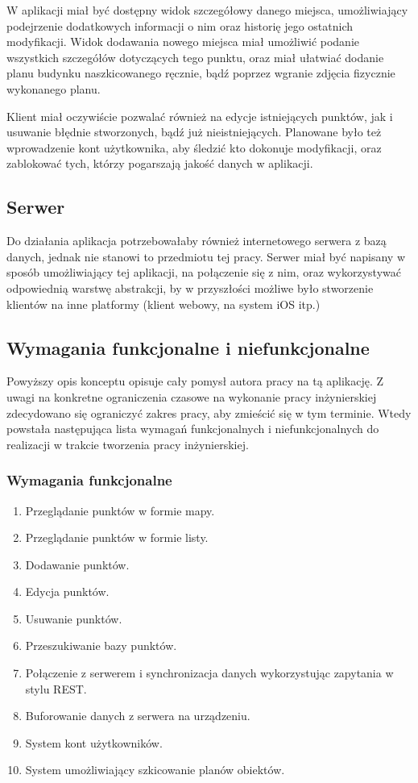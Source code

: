 \documentclass[polish,polish,a4paper,12pt]{article}
\begin{document}
	W aplikacji miał być dostępny widok szczegółowy danego miejsca, umożliwiający podejrzenie dodatkowych informacji o nim oraz historię jego ostatnich modyfikacji. Widok dodawania nowego miejsca miał umożliwić podanie wszystkich szczegółów dotyczących tego punktu, oraz miał ułatwiać dodanie planu budynku naszkicowanego ręcznie, bądź poprzez wgranie zdjęcia fizycznie wykonanego planu.

	Klient miał oczywiście pozwalać również na edycje istniejących punktów, jak i usuwanie błędnie stworzonych, bądź już nieistniejących. Planowane było też wprowadzenie kont użytkownika, aby śledzić kto dokonuje modyfikacji, oraz zablokować tych, którzy pogarszają jakość danych w aplikacji.

	\subsection{Serwer}

	Do działania aplikacja potrzebowałaby również internetowego serwera z bazą danych, jednak nie stanowi to przedmiotu tej pracy. Serwer miał być napisany w sposób umożliwiający tej aplikacji, na połączenie się z nim, oraz wykorzystywać odpowiednią warstwę abstrakcji, by w przyszłości możliwe było stworzenie klientów na inne platformy (klient webowy, na system iOS itp.)

	\subsection{Wymagania funkcjonalne i niefunkcjonalne}

	Powyższy opis konceptu opisuje cały pomysł autora pracy na tą aplikację. Z uwagi na konkretne ograniczenia czasowe na wykonanie pracy inżynierskiej zdecydowano się ograniczyć zakres pracy, aby zmieścić się w tym terminie. Wtedy powstała następująca lista wymagań funkcjonalnych i niefunkcjonalnych do realizacji w trakcie tworzenia pracy inżynierskiej.

		\subsubsection{Wymagania funkcjonalne}

		\begin{enumerate}
			\item Przeglądanie punktów w formie mapy.
			\item Przeglądanie punktów w formie listy.
			\item Dodawanie punktów.
			\item Edycja punktów.
			\item Usuwanie punktów.
			\item Przeszukiwanie bazy punktów.
			\item Połączenie z serwerem i synchronizacja danych wykorzystując zapytania w stylu REST.
			\item Buforowanie danych z serwera na urządzeniu.
			\item\label{accounts-req} System kont użytkowników.
			\item\label{drawing-req} System umożliwiający szkicowanie planów obiektów.
		\end{enumerate}
\end{document}
